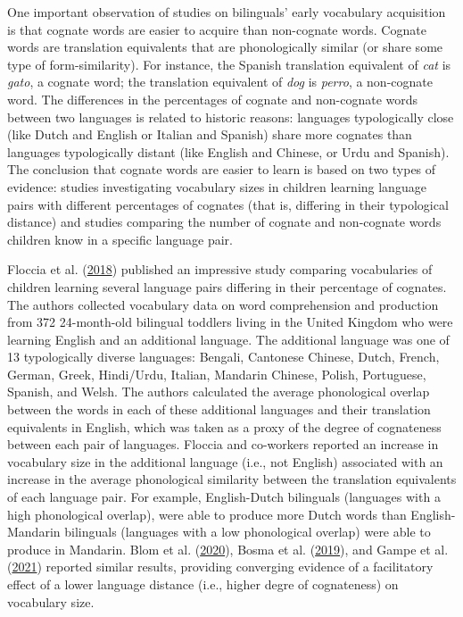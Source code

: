 \documentclass[
]{article}
\begin{document}
One important observation of studies on bilinguals' early vocabulary
acquisition is that cognate words are easier to acquire than non-cognate
words. Cognate words are translation equivalents that are phonologically
similar (or share some type of form-similarity). For instance, the
Spanish translation equivalent of \emph{cat} is \emph{gato}, a cognate
word; the translation equivalent of \emph{dog} is \emph{perro}, a
non-cognate word. The differences in the percentages of cognate and
non-cognate words between two languages is related to historic reasons:
languages typologically close (like Dutch and English or Italian and
Spanish) share more cognates than languages typologically distant (like
English and Chinese, or Urdu and Spanish). The conclusion that cognate
words are easier to learn is based on two types of evidence: studies
investigating vocabulary sizes in children learning language pairs with
different percentages of cognates (that is, differing in their
typological distance) and studies comparing the number of cognate and
non-cognate words children know in a specific language pair.

Floccia et al. (\protect\hyperlink{ref-floccia2018introduction}{2018})
published an impressive study comparing vocabularies of children
learning several language pairs differing in their percentage of
cognates. The authors collected vocabulary data on word comprehension
and production from 372 24-month-old bilingual toddlers living in the
United Kingdom who were learning English and an additional language. The
additional language was one of 13 typologically diverse languages:
Bengali, Cantonese Chinese, Dutch, French, German, Greek, Hindi/Urdu,
Italian, Mandarin Chinese, Polish, Portuguese, Spanish, and Welsh. The
authors calculated the average phonological overlap between the words in
each of these additional languages and their translation equivalents in
English, which was taken as a proxy of the degree of cognateness between
each pair of languages. Floccia and co-workers reported an increase in
vocabulary size in the additional language (i.e., not English)
associated with an increase in the average phonological similarity
between the translation equivalents of each language pair. For example,
English-Dutch bilinguals (languages with a high phonological overlap),
were able to produce more Dutch words than English-Mandarin bilinguals
(languages with a low phonological overlap) were able to produce in
Mandarin. Blom et al.
(\protect\hyperlink{ref-blom2020crosslanguage}{2020}), Bosma et al.
(\protect\hyperlink{ref-bosma2019longitudinal}{2019}), and Gampe et al.
(\protect\hyperlink{ref-gampe2021does}{2021}) reported similar results,
providing converging evidence of a facilitatory effect of a lower
language distance (i.e., higher degre of cognateness) on vocabulary
size.
\end{document}
